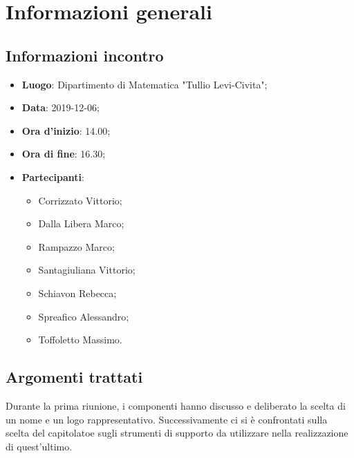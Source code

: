 \section{Informazioni generali}
    \subsection{Informazioni incontro}
        \begin{itemize}
            \item \textbf{Luogo}: Dipartimento di Matematica "Tullio Levi-Civita";
            \item \textbf{Data}: 2019-12-06;
            \item \textbf{Ora d'inizio}: 14.00;
            \item \textbf{Ora di fine}: 16.30;
            \item \textbf{Partecipanti}: \begin{itemize}
                \item Corrizzato Vittorio;
                \item Dalla Libera Marco;
                \item Rampazzo Marco;
                \item Santagiuliana Vittorio;
                \item Schiavon Rebecca;
                \item Spreafico Alessandro;
                \item Toffoletto Massimo.
            \end{itemize}
        \end{itemize}
    \subsection{Argomenti trattati}
        Durante la prima riunione, i componenti hanno discusso e deliberato la scelta di un nome e un logo rappresentativo.
        Successivamente ci si è confrontati sulla scelta del capitolato\glosp e sugli strumenti di supporto da utilizzare nella realizzazione
        di quest'ultimo.
